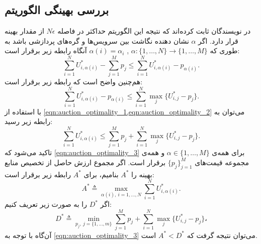     \subsection{بررسی بهینگی الگوریتم}
      در \cite{distributed_auction_algorithms_zavlanos} نویسندگان ثابت کرده‌اند که نتیجه این الگوریتم حداکثر در فاصله $N\epsilon$ از مقدار بهینه قرار دارد.
      اگر $\alpha$ نشان دهنده نگاشت بین سرویس‌ها و گره‌های پردازشی باشد به طوری که $\alpha: \{1, \hdots, N\} \rightarrow \{1, \hdots, M\}$ , $\alpha(i) = \alpha_i$ آنگاه رابطه زیر برقرار است:
      \begin{equation}\label{eqn:auction_optimality_1}
        \sum_{i=1}^N U_{i,\alpha(i)}^* - \sum_{j=1}^M p_j \le \sum_{i=1}^N U_{i,\alpha(i)}^* - p_{\alpha(i)}.
      \end{equation}
      هم‌چنین واضح است که رابطه زیر برقرار است:
      \begin{equation}\label{eqn:auction_optimality_2}
        \sum_{i=1}^N U_{i,\alpha(i)}^* - p_{\alpha(i)} \le \sum_{i=1}^N \max_j\{U_{i,j}^* - p_j\}.
      \end{equation}
      با استفاده از \cref{eqn:auction_optimality_1,eqn:auction_optimality_2} می‌توان به رابطه زیر رسید:
      \begin{equation}\label{eqn:auction_optimality_3}
        \sum_{i=1}^N U_{i,\alpha(i)}^* \le \sum_{j=1}^M p_j + \sum_{i=1}^N \max_j\{U_{i,j}^* - p_j\}.
      \end{equation}
      تاکید می‌شود که \cref{eqn:auction_optimality_3} برای همه‌ی $\alpha \in \{1,\hdots,M\}$ و همه‌ی مجموعه قیمت‌های $\{p_j\}_{j=1}^M$ برقرار است.
      اگر مجموع ارزش حاصل از تخصیص منابع بهینه را $A^*$ بنامیم، برای $A^*$ رابطه زیر برقرار است:
      \begin{equation}\label{eqn:auction_optimality_A_defenition}
        A^* \triangleq \max_{\alpha(i),~i=1, \hdots, N} \sum_{i=1}^N U_{i, \alpha(i)}^*.
      \end{equation}
      اگر $D^*$ را به صورت زیر تعریف ‌کنیم:
      \begin{equation}\label{eqn:auction_optimality_D_defenition}
        D^* \triangleq \min_{p_j,~j=\{1, \hdots, m\}} \sum_{j=1}^M p_j + \sum_{i=1}^N \max_j\{U_{i,j}^* - p_j\}،
      \end{equation}
      آن‌گاه با توجه به \cref{eqn:auction_optimality_3} می‌توان نتیجه گرفت که $A^*<D^*$ است.
      

